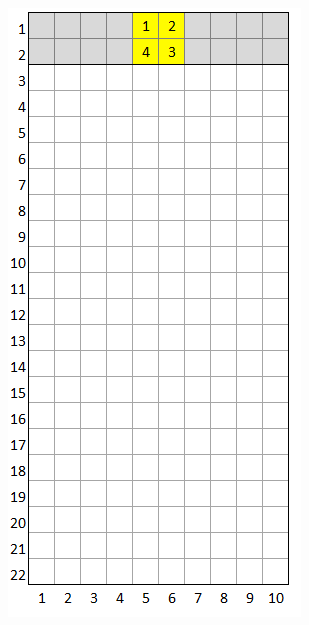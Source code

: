 \documentclass[a4paper]{article}
\begin{document}
	\begin{minipage}{0.25\textwidth}
		\centering
		\includegraphics[scale=0.4]{resources/img/minoes/mino_yellow}
		\label{fig:mino-yellow}
	\end{minipage}%
	
\end{document}
